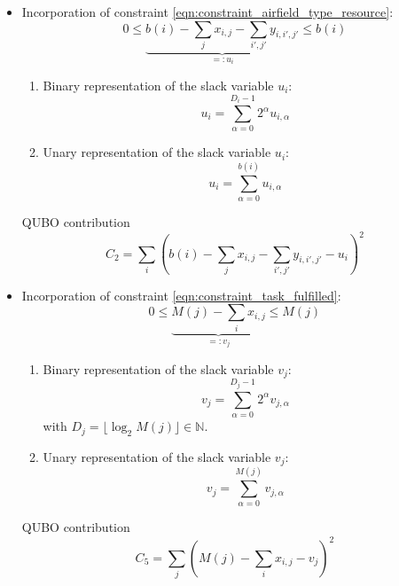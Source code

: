 \documentclass{article}
\begin{document}
\begin{itemize}
\item Incorporation of constraint \eqref{eqn:constraint_airfield_type_resource}:
    \begin{equation*}
        0 \leq \underbrace{b(i) - \sum_j x_{i,j} - \sum_{i', j'} y_{i, i', j'}}_{=:u_i} \leq b(i)
    \end{equation*}
    \begin{enumerate}
        \item 
        Binary representation of the slack variable $u_i$:
        \begin{equation*}
            u_{i} = \sum_{\alpha = 0}^{D_i - 1} 2^\alpha u_{i, \alpha}
        \end{equation*}
        \item 
        Unary representation of the slack variable $u_i$:
        \begin{equation*}
            u_{i} = \sum_{\alpha = 0}^{b(i)} u_{i, \alpha}
        \end{equation*}
    \end{enumerate}
    QUBO contribution
    \begin{equation*}
        C_2 = \sum_i \left( b(i) - \sum_j x_{i,j} - \sum_{i', j'} y_{i, i', j'} - u_i \right)^2
    \end{equation*}
\item Incorporation of constraint \eqref{eqn:constraint_task_fulfilled}:
    \begin{equation*}
        0 \leq \underbrace{M(j) - \sum_i x_{i,j}}_{=:v_j} \leq M(j)
    \end{equation*}
    \begin{enumerate}
        \item 
        Binary representation of the slack variable $v_j$:
        \begin{equation*}
            v_{j} = \sum_{\alpha = 0}^{D_j - 1} 2^\alpha v_{j, \alpha} 
        \end{equation*}
        with $D_j = \lfloor \log_2 M(j) \rfloor \in \mathbb{N}$.
        \item 
        Unary representation of the slack variable $v_j$:
        \begin{equation*}
            v_{j} = \sum_{\alpha = 0}^{M(j)} v_{j, \alpha}
        \end{equation*}
    \end{enumerate}
    QUBO contribution
    \begin{equation*}
        C_5 = \sum_j \left( M(j) - \sum_i x_{i,j} -  v_j \right)^2

\end{equation*}
\end{itemize}
\end{document}
